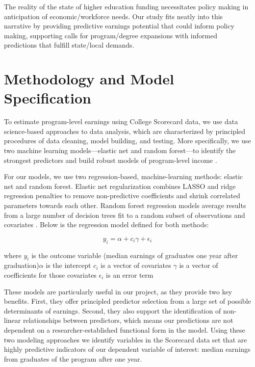 \documentclass[a4paper, 12pt]{article}
\begin{document}
The reality of the state of higher education funding
necessitates policy making in anticipation of economic/workforce
needs. Our study fits neatly into this narrative by providing
predictive earnings potential that could inform policy making,
supporting calls for program/degree expansions with informed
predictions that fulfill state/local demands.

\section*{Methodology and Model Specification}

To estimate program-level earnings using College Scorecard data, we
use data science-based approaches to data analysis, which are
characterized by principled procedures of data cleaning, model
building, and testing. More specifically, we use two machine learning
models---elastic net and random forest---to identify the strongest
predictors and build robust models of program-level income
\parencite{Hastie_etal_2016, Kuhn_Silge_2022}.

For our models, we use two regression-based, machine-learning methods:
elastic net and random forest. Elastic net regularization combines
LASSO and ridge regression penalties to remove non-predictive
coefficients and shrink correlated parameters towards each
other. Random forest regression models average results from a large
number of decision trees fit to a random subset of observations and
covariates \parencite{Hastie_etal_2016}. Below is the regression model
defined for both methods:

\[y_i = \alpha + c_i\gamma + \epsilon_i\]


\noindent where \newline $y_i$ is the outcome variable (median
earnings of graduates one year after graduation)\newline $\alpha$ is
the intercept \newline $c_i$ is a vector of covariates \newline
$\gamma$ is a vector of coefficients for those covariates \newline
$\epsilon_i$ is an error term

These models are particularly useful in our project, as they provide
two key benefits. First, they offer principled predictor selection
from a large set of possible determinants of earnings. Second, they
also support the identification of non-linear relationships between
predictors, which means our predictions are not dependent on a
researcher-established functional form in the model. Using these two
modeling approaches we identify variables in the Scorecard data set
that are highly predictive indicators of our dependent variable of
interest: median earnings from graduates of the program after one
year.
\end{document}
